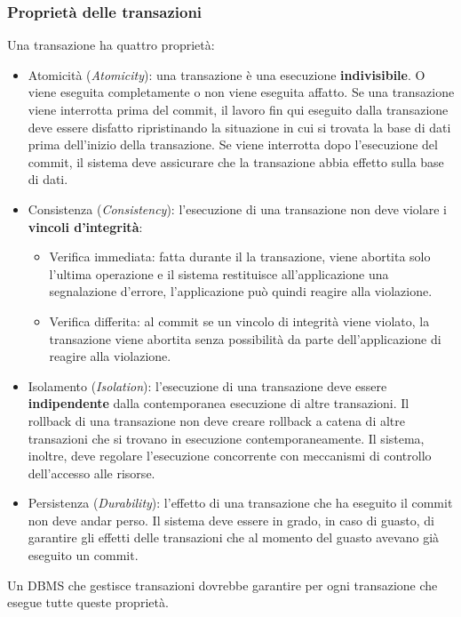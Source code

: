 \documentclass[oneside,a4paper,11pt]{book}
\theoremstyle{italicstyle}
\theoremstyle{normStyle}
\begin{document}
\subsubsection{Proprietà delle transazioni}
Una transazione ha quattro proprietà:
\begin{itemize}
    \item Atomicità (\textit{Atomicity}): una transazione è una esecuzione 
    \textbf{indivisibile}. O viene eseguita completamente o non viene eseguita affatto.
    Se una transazione viene interrotta prima del commit, il lavoro fin qui 
    eseguito dalla transazione deve essere disfatto ripristinando la situazione in 
    cui si trovata la base di dati prima dell'inizio della transazione. Se 
    viene interrotta dopo l'esecuzione del commit, il sistema deve assicurare che 
    la transazione abbia effetto sulla base di dati.
    \item Consistenza (\textit{Consistency}): l'esecuzione di una transazione non deve 
    violare i \textbf{vincoli d'integrità}:
    \begin{itemize}
        \item Verifica immediata: fatta durante il la transazione, viene abortita solo 
        l'ultima operazione e il sistema restituisce all'applicazione una segnalazione 
        d'errore, l'applicazione può quindi reagire alla violazione.
        \item Verifica differita: al commit se un vincolo di integrità viene 
        violato, la transazione viene abortita senza possibilità da parte 
        dell'applicazione di reagire alla violazione.
    \end{itemize}
    \item Isolamento (\textit{Isolation}): l'esecuzione di una transazione deve essere 
    \textbf{indipendente} dalla contemporanea esecuzione di altre transazioni. Il rollback 
    di una transazione non deve creare rollback a catena di altre transazioni che 
    si trovano in esecuzione contemporaneamente. Il sistema, inoltre, deve
    regolare l'esecuzione concorrente con meccanismi di controllo dell'accesso 
    alle risorse.
    \item Persistenza (\textit{Durability}): l'effetto di una transazione che ha eseguito il commit
    non deve andar perso. Il sistema deve essere in grado, in caso di guasto, di garantire 
    gli effetti delle transazioni che al momento del guasto avevano già 
    eseguito un commit.
\end{itemize}
Un DBMS che gestisce transazioni dovrebbe garantire per ogni transazione 
che esegue tutte queste proprietà.
\end{document}
